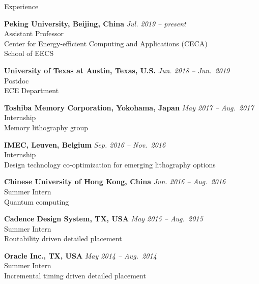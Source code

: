 
\begin{rSection}{Experience}

{\bf Peking University, Beijing, China}                           \hfill {\em Jul. 2019 -- present} \\
Assistant Professor \\
Center for Energy-efficient Computing and Applications (CECA) \\
School of EECS

{\bf University of Texas at Austin, Texas, U.S.}                           \hfill {\em Jun. 2018 -- Jun.~2019} \\
Postdoc \\
ECE Department

{\bf Toshiba Memory Corporation, Yokohama, Japan}                           \hfill {\em May 2017 -- Aug.~2017} \\
Internship \\
Memory lithography group

{\bf IMEC, Leuven, Belgium}                           \hfill {\em Sep. 2016 -- Nov.~2016} \\
Internship \\
Design technology co-optimization for emerging lithography options

{\bf Chinese University of Hong Kong, China}                           \hfill {\em Jun. 2016 -- Aug.~2016} \\
Summer Intern \\
Quantum computing

{\bf Cadence Design System, TX, USA}                           \hfill {\em May 2015 -- Aug.~2015} \\
Summer Intern \\
Routability driven detailed placement

{\bf Oracle Inc., TX, USA}                           \hfill {\em May 2014 -- Aug.~2014} \\
Summer Intern \\
Incremental timing driven detailed placement


\end{rSection}


